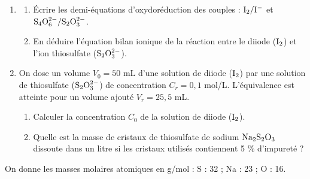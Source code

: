 \documentclass[11pt]{article}
\begin{document}
\begin{enumerate}
  \item \begin{enumerate}[label=\alph*.]
    \item Écrire les demi-équations d'oxydoréduction des couples : $\mathrm{I_2/I^-}$ et $\mathrm{S_4O_6^{2-}/S_2O_3^{2-}}$.
    \item En déduire l'équation bilan ionique de la réaction entre le diiode ($\mathrm{I_2}$) et l'ion thiosulfate ($\mathrm{S_2O_3^{2-}}$).
  \end{enumerate}
  \item On dose un volume $V_0 = 50$ mL d'une solution de diiode ($\mathrm{I_2}$) par une solution de thiosulfate ($\mathrm{S_2O_3^{2-}}$) de concentration $C_r = 0{,}1$ mol/L. L'équivalence est atteinte pour un volume ajouté $V_r = 25{,}5$ mL.
  \begin{enumerate}[label=\alph*.]
    \item Calculer la concentration $C_0$ de la solution de diiode ($\mathrm{I_2}$).
    \item Quelle est la masse de cristaux de thiosulfate de sodium $\mathrm{Na_2S_2O_3}$ dissoute dans un litre si les cristaux utilisés contiennent 5 \% d'impureté ?
  \end{enumerate}
\end{enumerate}
\noindent On donne les masses molaires atomiques en g/mol : S : 32 ; Na : 23 ; O : 16.
\end{document}
